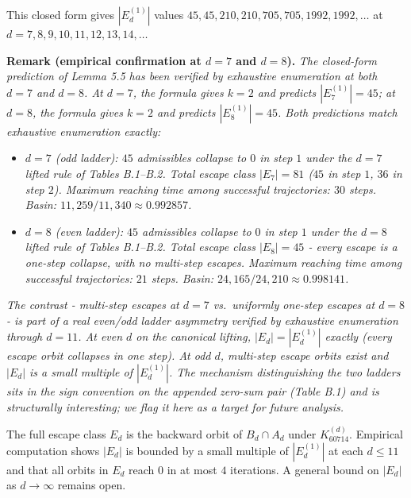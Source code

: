 \documentclass[11pt,letterpaper]{article}
\providecommand{\tightlist}{%
  \setlength{\itemsep}{0pt}\setlength{\parskip}{0pt}}
\theoremstyle{paperstyle}
\theoremstyle{paperstyledef}
\theoremstyle{paperstylerem}
\begin{document}
This closed form gives \(|E_d^{(1)}|\) values
\(45, 45, 210, 210, 705, 705, 1992, 1992, \ldots\) at
\(d = 7, 8, 9, 10, 11, 12, 13, 14, \ldots\)

\textbf{Remark (empirical confirmation at \(d = 7\) and \(d = 8\)).}
\emph{The closed-form prediction of Lemma 5.5 has been verified by
exhaustive enumeration at both \(d = 7\) and \(d = 8\). At \(d = 7\),
the formula gives \(k = 2\) and predicts \(|E_7^{(1)}| = 45\); at
\(d = 8\), the formula gives \(k = 2\) and predicts
\(|E_8^{(1)}| = 45\). Both predictions match exhaustive enumeration
exactly:}

\begin{itemize}
\tightlist
\item
  \emph{\(d = 7\) (odd ladder): \(45\) admissibles collapse to \(0\) in
  step \(1\) under the \(d = 7\) lifted rule of Tables B.1--B.2. Total
  escape class \(|E_7| = 81\) (\(45\) in step \(1\), \(36\) in step
  \(2\)). Maximum reaching time among successful trajectories: \(30\)
  steps. Basin: \(11{,}259/11{,}340 \approx 0.992857\).}
\item
  \emph{\(d = 8\) (even ladder): \(45\) admissibles collapse to \(0\) in
  step \(1\) under the \(d = 8\) lifted rule of Tables B.1--B.2. Total
  escape class \(|E_8| = 45\) - every escape is a one-step collapse,
  with no multi-step escapes. Maximum reaching time among successful
  trajectories: \(21\) steps. Basin:
  \(24{,}165/24{,}210 \approx 0.998141\).}
\end{itemize}

\emph{The contrast - multi-step escapes at \(d = 7\) vs.~uniformly
one-step escapes at \(d = 8\) - is part of a real even/odd ladder
asymmetry verified by exhaustive enumeration through \(d = 11\). At even
\(d\) on the canonical lifting, \(|E_d| = |E_d^{(1)}|\) exactly (every
escape orbit collapses in one step). At odd \(d\), multi-step escape
orbits exist and \(|E_d|\) is a small multiple of \(|E_d^{(1)}|\). The
mechanism distinguishing the two ladders sits in the sign convention on
the appended zero-sum pair (Table B.1) and is structurally interesting;
we flag it here as a target for future analysis.}

The full escape class \(E_d\) is the backward orbit of \(B_d \cap A_d\)
under \(K_{60714}^{(d)}\). Empirical computation shows \(|E_d|\) is
bounded by a small multiple of \(|E_d^{(1)}|\) at each \(d \leq 11\) and
that all orbits in \(E_d\) reach \(0\) in at most \(4\) iterations. A
general bound on \(|E_d|\) as \(d \to \infty\) remains open.
\end{document}
